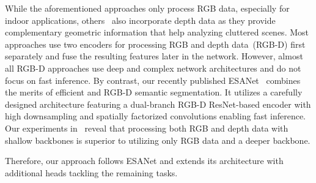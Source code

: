 \documentclass[conference]{IEEEtran}
\begin{document}
While the aforementioned approaches only process RGB data, especially for indoor applications, others~\cite{FuseNet-accv2016, ACNet-icip2019, SSMA-ijcv2019, RDFNet-iccv2017, ShapeConv-cvpr2021} also incorporate depth data as they provide complementary geometric information that help analyzing cluttered scenes.
Most approaches use two encoders for processing RGB and depth data~(RGB-D) first separately and fuse the resulting features later in the network.
However, almost all RGB-D approaches use deep and complex network architectures and do not focus on fast inference.
By contrast, our recently published ESANet~\cite{esanet2021icra} combines the merits of efficient and \mbox{RGB-D} semantic segmentation. 
It utilizes a carefully designed architecture featuring a dual-branch RGB-D ResNet-based encoder with high downsampling and spatially factorized convolutions enabling fast inference.
Our experiments in~\cite{esanet2021icra} reveal that processing both RGB and depth data with shallow backbones is superior to utilizing only RGB data and a deeper backbone.

Therefore, our approach follows ESANet and extends its architecture with additional heads tackling the remaining tasks.
\end{document}
